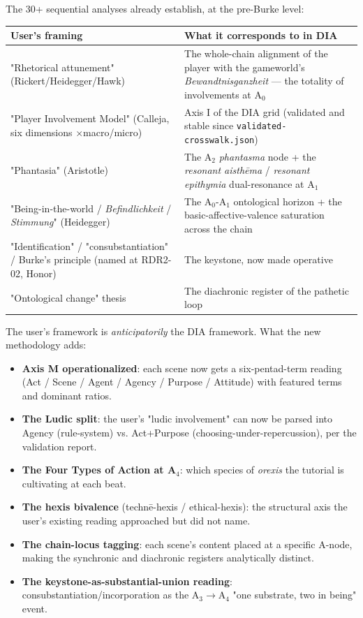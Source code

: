 \documentclass[11pt]{report}
\begin{document}
The 30+ sequential analyses already establish, at the pre-Burke level:


\begin{table}[H]
\renewcommand{\arraystretch}{1.25}
\begin{tabularx}{\textwidth}{>{\RaggedRight\arraybackslash}X>{\RaggedRight\arraybackslash}X}
\toprule
User's framing & What it corresponds to in DIA \\
\midrule
"Rhetorical attunement" (Rickert/Heidegger/Hawk) & The whole-chain alignment of the player with the gameworld's \textit{Bewandtnisganzheit} — the totality of involvements at A$_0$ \\
"Player Involvement Model" (Calleja, six dimensions $\times$\allowbreak  macro/micro) & Axis I of the DIA grid (validated and stable since \texttt{validated-\discretionary{}{}{}crosswalk.\discretionary{}{}{}json}) \\
"Phantasia" (Aristotle) & The A$_2$ \textit{phantasma} node + the \textit{resonant aisthēma} / \textit{resonant epithymia} dual-resonance at A$_1$ \\
"Being-in-the-world / \textit{Befindlichkeit} / \textit{Stimmung}" (Heidegger) & The A$_0$-A$_1$ ontological horizon + the basic-affective-valence saturation across the chain \\
"Identification" / "consubstantiation" / Burke's principle (named at RDR2-02, Honor) & The keystone, now made operative \\
"Ontological change" thesis & The diachronic register of the pathetic loop \\
\bottomrule
\end{tabularx}
\end{table}


The user's framework is \textit{anticipatorily} the DIA framework. What the new methodology adds:


\begin{itemize}
\item \textbf{Axis M operationalized}: each scene now gets a six-pentad-term reading (Act / Scene / Agent / Agency / Purpose / Attitude) with featured terms and dominant ratios.
\item \textbf{The Ludic split}: the user's "ludic involvement" can now be parsed into Agency (rule-system) vs. Act+Purpose (choosing-under-repercussion), per the validation report.
\item \textbf{The Four Types of Action at A$_4$}: which species of \textit{orexis} the tutorial is cultivating at each beat.
\item \textbf{The hexis bivalence} (technē-hexis / ethical-hexis): the structural axis the user's existing reading approached but did not name.
\item \textbf{The chain-locus tagging}: each scene's content placed at a specific A-node, making the synchronic and diachronic registers analytically distinct.
\item \textbf{The keystone-as-substantial-union reading}: consubstantiation/incorporation as the A$_3$$\rightarrow$\allowbreak A$_4$ "one substrate, two in being" event.
\end{itemize}
\end{document}
